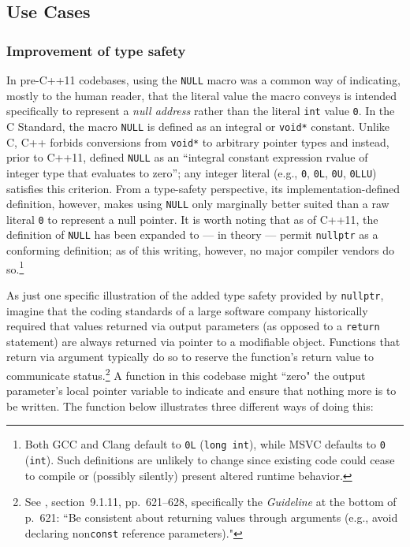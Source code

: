 \subsection[Use Cases]{Use Cases}\label{use-cases}

\subsubsection[Improvement of type safety]{Improvement of type safety}\label{improve-type-safety}

In pre-C++11 codebases, using the \lstinline!NULL!
macro was a common way of indicating, mostly to the human
reader, that the literal value the macro conveys is intended specifically to
represent a \emph{null address} rather than the literal \lstinline!int!
value \lstinline!0!. In the C Standard, the macro \lstinline!NULL! is
defined as an  integral or \lstinline!void*!
constant. Unlike C, C++ forbids conversions from \lstinline!void*! to
arbitrary pointer types and instead, prior to C++11, defined
\lstinline!NULL! as an ``integral constant expression rvalue of
integer type that evaluates to zero''; any integer literal (e.g.,
\lstinline!0!, \lstinline!0L!, \lstinline!0U!, \lstinline!0LLU!) satisfies this
  criterion. From a type-safety perspective, its
implementation-defined definition, however,
makes using \lstinline!NULL! only marginally better suited than a raw
literal \lstinline!0! to represent a null pointer. It is worth noting that as of C++11, the definition of \lstinline!NULL! has been expanded to --- in theory --- permit \lstinline!nullptr! as a conforming definition; as of this writing, however, no major compiler vendors do so.{\cprotect\footnote{Both GCC and
Clang default to \lstinline!0L! (\lstinline!long!~\lstinline!int!), while MSVC
defaults to \lstinline!0! (\lstinline!int!). Such definitions are unlikely
to change since existing code could cease to compile or (possibly
  silently) present altered runtime behavior.}}

As just one specific illustration of the added type safety provided by
\lstinline!nullptr!, imagine that the coding standards of a large software company historically required that
values returned via output parameters (as opposed to a \lstinline!return!
statement) are always returned via pointer to a modifiable
object. Functions that return via argument typically do so to reserve the function’s return value to communicate status.{\cprotect\footnote{See \cite{lakos96}, section~9.1.11, pp.~621--628, specifically the \emph{Guideline} at the bottom of p.~621: ``Be consistent about returning values through arguments (e.g., avoid declaring non\lstinline!const! reference parameters)."}} A function in this codebase might ``zero" the output parameter's local pointer variable to indicate and ensure that nothing more is to be written. The function below illustrates three different ways of doing this:

